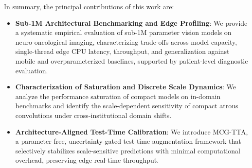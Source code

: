 In summary, the principal contributions of this work are:
\begin{itemize}
\item \textbf{Sub-1M Architectural Benchmarking and Edge Profiling}: We provide a systematic empirical evaluation of sub-1M parameter vision models on neuro-oncological imaging, characterizing trade-offs across model capacity, single-thread edge CPU latency, throughput, and generalization against mobile and overparameterized baselines, supported by patient-level diagnostic evaluation.
\item \textbf{Characterization of Saturation and Discrete Scale Dynamics}: We analyze the performance saturation of compact models on in-domain benchmarks and identify the scale-dependent sensitivity of compact atrous convolutions under cross-institutional domain shifts.
\item \textbf{Architecture-Aligned Test-Time Calibration}: We introduce MCG-TTA, a parameter-free, uncertainty-gated test-time augmentation framework that selectively stabilizes scale-sensitive predictions with minimal computational overhead, preserving edge real-time throughput.
\end{itemize}
